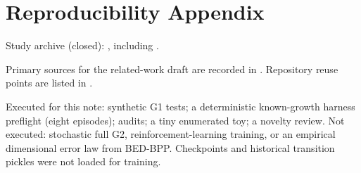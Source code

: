 \section*{Reproducibility Appendix}

Study archive (closed):
, including
.

Primary sources for the related-work draft are recorded in
. Repository reuse points are listed in
.

Executed for this note: synthetic G1 tests; a deterministic known-growth
harness preflight (eight episodes); audits; a tiny enumerated toy; a novelty
review. Not executed: stochastic full G2, reinforcement-learning training, or
an empirical dimensional error law from BED-BPP. Checkpoints and historical
transition pickles were not loaded for training.
